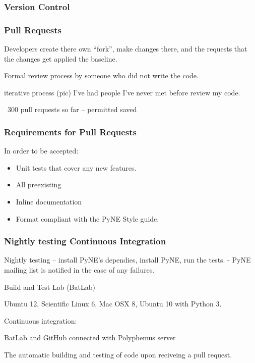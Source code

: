 \documentclass[12pt]{beamer}
\begin{document}
\begin{frame}
\frametitle{Version Control}

\cite{git}

\end{frame}

\begin{frame}
\frametitle{Pull Requests}

Developers create there own ``fork'', make changes there, and the requests that the changes get applied the baseline.

Formal review process by someone who did not write the code.

iterative process (pic)
I've had people I've never met before review my code.

~300 pull requests so far -- permitted saved 

\end{frame}

\begin{frame}
\frametitle{Requirements for Pull Requests}
In order to be accepted:
\begin{itemize}
\item{Unit tests that cover any new features.}
\item{All preexisting}
\item{Inline documentation}
\item{Format compliant with the PyNE Style guide.}
\end{itemize}

\end{frame}



\begin{frame}
\frametitle{Nightly testing Continuous Integration}

Nightly testing -- install PyNE's dependies, install PyNE, run the tests.
- PyNE mailing list is notified in the case of any failures.

Build and Test Lab (BatLab)

Ubuntu 12, Scientific Linux 6, Mac OSX 8, Ubuntu 10 with Python 3.

Continuous integration:

BatLab and GitHub connected with Polyphemus server


The automatic building and testing of code upon reciveing a pull request.

\cite{beck1998extreme}
\cite{batlab_2014}
\cite{polyphemus_2014}

\end{frame}
\end{document}
